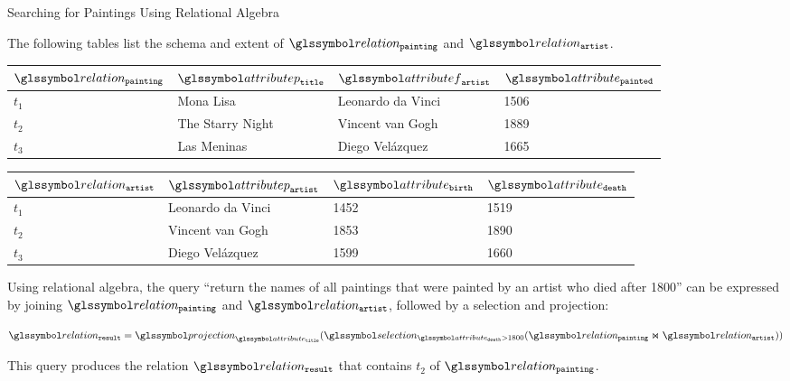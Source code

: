 \begin{example}[label=example:rel_alg_query]{Searching for Paintings Using Relational Algebra}{}

    The following tables list the schema and extent of $\relation_{\mathtt{painting}}$ and $\relation_{\mathtt{artist}}$.

    \begin{center}
        \begin{tabular}{ l || l | l | l |}
            $\relation_{\mathtt{painting}}$ & $\attributep_{\mathtt{title}}$  & $\attributef_{\mathtt{artist}}$  & $\attribute_{\mathtt{painted}}$ \\ 
            \hline
            \hline
            $t_1$ & Mona Lisa &  Leonardo da Vinci & 1506 \\
            \hline
            $t_2$ & The Starry Night & Vincent van Gogh & 1889 \\
            \hline
            $t_3$ & Las Meninas & Diego Velázquez & 1665 \\
            \hline
        \end{tabular}
    \end{center}

    \begin{center}
        \begin{tabular}{ l || l | l | l |}
            $\relation_{\mathtt{artist}}$ & $\attributep_{\mathtt{artist}}$ & $\attribute_{\mathtt{birth}}$ & $\attribute_{\mathtt{death}}$\\ 
            \hline
            \hline
            $t_1$ & Leonardo da Vinci & 1452 & 1519 \\
            \hline
            $t_2$ & Vincent van Gogh & 1853 & 1890 \\
            \hline
            $t_3$ & Diego Velázquez & 1599 & 1660 \\
            \hline
        \end{tabular}
    \end{center}

    Using relational algebra, the query ``return the names of all paintings that were painted by an artist who died after 1800'' can be expressed by joining $\relation_{\mathtt{painting}}$ and $\relation_{\mathtt{artist}}$, followed by a selection and projection:

    \begin{equation*}
        \relation_{\mathtt{result}} = \projection_{\attribute_{\mathtt{title}}} (\selection_{\attribute_{\mathtt{death}} > 1800}(\relation_{\mathtt{painting}} \Join \relation_{\mathtt{artist}}))
    \end{equation*}

 This query produces the relation $\relation_{\mathtt{result}}$ that contains $t_2$ of $\relation_{\mathtt{painting}}$.
\end{example}

